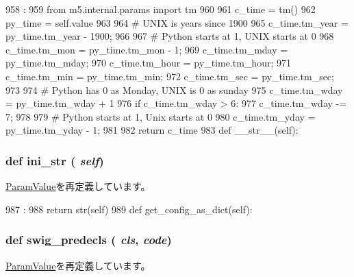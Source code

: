 \begin{DoxyCode}
958                       :
959         from m5.internal.params import tm
960 
961         c_time = tm()
962         py_time = self.value
963 
964         # UNIX is years since 1900
965         c_time.tm_year = py_time.tm_year - 1900;
966 
967         # Python starts at 1, UNIX starts at 0
968         c_time.tm_mon =  py_time.tm_mon - 1;
969         c_time.tm_mday = py_time.tm_mday;
970         c_time.tm_hour = py_time.tm_hour;
971         c_time.tm_min = py_time.tm_min;
972         c_time.tm_sec = py_time.tm_sec;
973 
974         # Python has 0 as Monday, UNIX is 0 as sunday
975         c_time.tm_wday = py_time.tm_wday + 1
976         if c_time.tm_wday > 6:
977             c_time.tm_wday -= 7;
978 
979         # Python starts at 1, Unix starts at 0
980         c_time.tm_yday = py_time.tm_yday - 1;
981 
982         return c_time
983 
    def __str__(self):
\end{DoxyCode}
\hypertarget{classm5_1_1params_1_1Time_a33ebe6cd32bcbd15465fc28b9d94bf82}{
\subsubsection[{ini\_\-str}]{\setlength{\rightskip}{0pt plus 5cm}def ini\_\-str ( {\em self})}}
\label{classm5_1_1params_1_1Time_a33ebe6cd32bcbd15465fc28b9d94bf82}


\hyperlink{classm5_1_1params_1_1ParamValue_a33ebe6cd32bcbd15465fc28b9d94bf82}{ParamValue}を再定義しています。


\begin{DoxyCode}
987                      :
988         return str(self)
989 
    def get_config_as_dict(self):
\end{DoxyCode}
\hypertarget{classm5_1_1params_1_1Time_ab3dbcf5716623eac67a8ccc074fa7e13}{
\subsubsection[{swig\_\-predecls}]{\setlength{\rightskip}{0pt plus 5cm}def swig\_\-predecls ( {\em cls}, \/   {\em code})}}
\label{classm5_1_1params_1_1Time_ab3dbcf5716623eac67a8ccc074fa7e13}


\hyperlink{classm5_1_1params_1_1ParamValue_ab3dbcf5716623eac67a8ccc074fa7e13}{ParamValue}を再定義しています。


